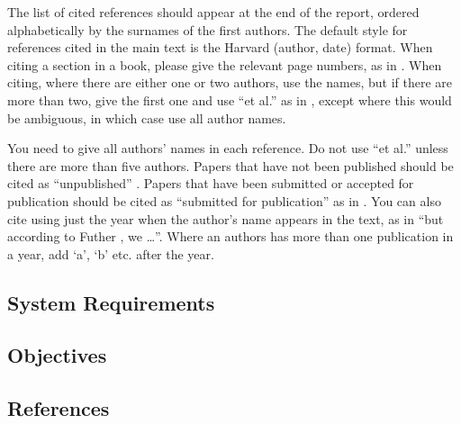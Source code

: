 \documentclass[12pt,a4paper]{article}
\begin{document}
The list of cited references should appear at the end of the report, ordered alphabetically by the surnames of the first authors.  The default style for references cited in the main text is the  Harvard (author, date) format.  When citing a section in a book, please give the relevant page numbers, as in \cite[p293]{budgen}.  When citing, where there are either one or two authors, use the names, but if there are more than two, give the first one and use ``et al.'' as in  , except where this would be ambiguous, in which case use all author names.

You need to give all authors' names in each reference.  Do not use ``et al.'' unless there are more than five authors.  Papers that have not been published should be cited as ``unpublished'' \cite{euther}.  Papers that have been submitted or accepted for publication should be cited as ``submitted for publication'' as in \cite{futher} .  You can also cite using just the year when the author's name appears in the text, as in ``but according to Futher \citeyear{futher}, we \dots''.  Where an authors has more than one publication in a year, add `a', `b' etc. after the year.

\subsection{System Requirements}

\subsection{Objectives}

\subsection{References}





\end{document}

